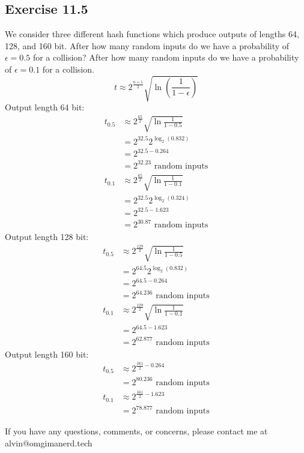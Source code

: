 \documentclass{math}
\begin{document}
\subsection*{Exercise 11.5}
We consider three different hash functions which produce outputs of lengths
64, 128, and 160 bit. After how many random inputs do we have a probability of
\( \epsilon = 0.5 \) for a collision? After how many random inputs do we have a
probability of \( \epsilon = 0.1 \) for a collision. \\
\[ t \approx 2^{\frac{n+1}{2}}\sqrt{\ln(\frac{1}{1-\epsilon})} \]
Output length 64 bit:
\begin{align*}
  t_{0.5} &\approx 2^{\frac{65}{2}}\sqrt{\ln\frac{1}{1-0.5}} \\
  &= 2^{32.5}2^{\log_2(0.832)} \\
  &= 2^{32.5-0.264} \\
  &= 2^{32.23} \text{ random inputs} \\
  t_{0.1} &\approx 2^{\frac{65}{2}}\sqrt{\ln\frac{1}{1-0.1}} \\
  &= 2^{32.5}2^{\log_2(0.324)} \\
  &= 2^{32.5-1.623} \\
  &= 2^{30.87} \text{ random inputs}
\end{align*}
Output length 128 bit:
\begin{align*}
  t_{0.5} &\approx 2^{\frac{129}{2}}\sqrt{\ln\frac{1}{1-0.5}} \\
  &= 2^{64.5}2^{\log_2(0.832)} \\
  &= 2^{64.5-0.264} \\
  &= 2^{64.236} \text{ random inputs} \\
  t_{0.1} &\approx 2^{\frac{129}{2}}\sqrt{\ln\frac{1}{1-0.1}} \\
  &= 2^{64.5-1.623} \\
  &= 2^{62.877} \text{ random inputs}
\end{align*}
Output length 160 bit:
\begin{align*}
  t_{0.5} &\approx 2^{\frac{161}{2}-0.264} \\
  &= 2^{80.236} \text{ random inputs} \\
  t_{0.1} &\approx 2^{\frac{161}{2}-1.623} \\
  &= 2^{78.877} \text{ random inputs}
\end{align*}

\begin{center}
  If you have any questions, comments, or concerns, please contact me at
  alvin@omgimanerd.tech
\end{center}
\end{document}
